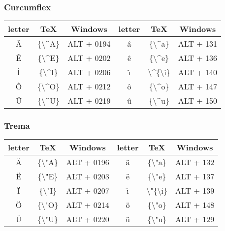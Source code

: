 \subsubsection{Curcumflex}

\begin{center}\begin{tabular}{|c|c|c||c|c|c|} \hline
  \textbf{letter} & \textbf{TeX} & \textbf{Windows} & \textbf{letter} & \textbf{TeX} & \textbf{Windows} \\ \hline
  {\^A} & \{\textbackslash\textasciicircum A\} & ALT + 0194 & {\^a} & \{\textbackslash\textasciicircum a\} & ALT + 131 \\ \hline
  {\^E} & \{\textbackslash\textasciicircum E\} & ALT + 0202 & {\^e} & \{\textbackslash\textasciicircum e\} & ALT + 136 \\ \hline
  {\^I} & \{\textbackslash\textasciicircum I\} & ALT + 0206 & \^{\i} & \textbackslash\textasciicircum \{\textbackslash i\} & ALT + 140 \\ \hline
  {\^O} & \{\textbackslash\textasciicircum O\} & ALT + 0212 & {\^o} & \{\textbackslash\textasciicircum o\} & ALT + 147 \\ \hline
  {\^U} & \{\textbackslash\textasciicircum U\} & ALT + 0219 & {\^u} & \{\textbackslash\textasciicircum u\} & ALT + 150 \\ \hline
\end{tabular}\end{center}

\subsubsection{Trema}

\begin{center}\begin{tabular}{|c|c|c||c|c|c|} \hline
  \textbf{letter} & \textbf{TeX} & \textbf{Windows} & \textbf{letter} & \textbf{TeX} & \textbf{Windows} \\ \hline
  {\"A} & \{\textbackslash "A\} & ALT + 0196 & {\"a} & \{\textbackslash "a\} & ALT + 132 \\ \hline
  {\"E} & \{\textbackslash "E\} & ALT + 0203 & {\"e} & \{\textbackslash "e\} & ALT + 137 \\ \hline
  {\"I} & \{\textbackslash "I\} & ALT + 0207 & \"{\i} & \textbackslash "\{\textbackslash i\} & ALT + 139 \\ \hline
  {\"O} & \{\textbackslash "O\} & ALT + 0214 & {\"o} & \{\textbackslash "o\} & ALT + 148 \\ \hline
  {\"U} & \{\textbackslash "U\} & ALT + 0220 & {\"u} & \{\textbackslash "u\} & ALT + 129 \\ \hline
\end{tabular}\end{center}

